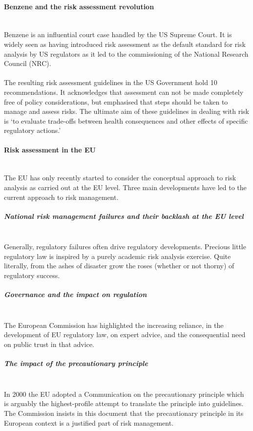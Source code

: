 \documentclass[../summary.tex]{subfiles}
\begin{document}
\paragraph{Benzene and the risk assessment revolution}\mbox{}
\\
Benzene is an influential court case handled by the US Supreme Court. It is widely seen as having introduced risk assessment as the default standard for risk analysis by US regulators as it led to the commissioning of the National Research Council (NRC).
\\\\
The resulting risk assessment guidelines in the US Government hold 10 recommendations. It acknowledges that assessment can not be made completely free of policy considerations, but emphasised that steps should be taken to manage and assess risks. The ultimate aim of these guidelines in dealing with risk is `to evaluate trade-offs between health consequences and other effects of specific regulatory actions.'

\paragraph{Risk assessment in the EU}\mbox{}
\\
The EU has only recently started to consider the conceptual approach to risk analysis as carried out at the EU level. Three main developments have led to the current approach to risk management.

\subparagraph{National risk management failures and their backlash at the EU level}\mbox{}
\\
Generally, regulatory failures often drive regulatory developments. Precious little regulatory law is inspired by a purely academic risk analysis exercise. Quite literally, from the ashes of disaster grow the roses (whether or not thorny) of regulatory success.

\subparagraph{Governance and the impact on regulation}\mbox{}
\\
The European Commission has highlighted the increasing reliance, in the development of EU regulatory law, on expert advice, and the consequential need on public trust in that advice.

\subparagraph{The impact of the precautionary principle}\mbox{}
\\
In 2000 the EU adopted a Communication on the precautionary principle which is arguably the highest-profile attempt to translate the principle into guidelines. The Commission insists in this document that the precautionary principle in its European context is a justified part of risk management.
\\
\end{document}
